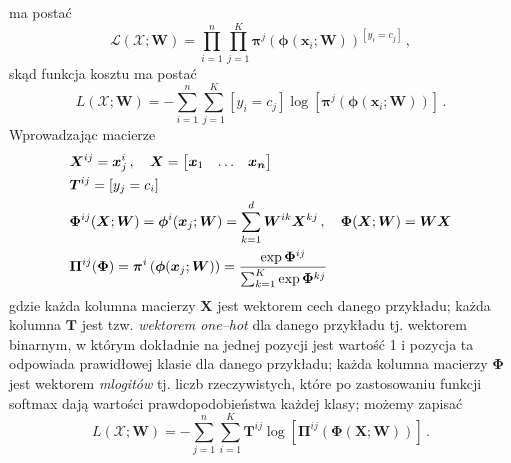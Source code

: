 \documentclass{myclass}
\numberwithin{equation}{subsection}
\begin{document}
ma postać
\begin{equation}
    \mathcal{L}(\mathcal{X}; \bm{W}) = \prod_{i=1}^n \prod_{j=1}^K \bm{\pi}^j\left(\bm{\phi}(\bm{x}_i; \bm{W})\right)^{[y_i = c_j]}\,,
\end{equation}
skąd funkcja kosztu ma postać
\begin{equation}
    L(\mathcal{X}; \bm{W}) = - \sum_{i=1}^n \sum_{j=1}^K [y_i = c_j] \log \left[ \bm{\pi}^j\left(\bm{\phi}(\bm{x}_i; \bm{W})\right)\right]\,.
\end{equation}
Wprowadzając macierze 
\begin{equation*}
    \begin{split}
        &\bm{X}^{ij} = \bm{x}_j^i\,,\quad \bm{X} = \mqty[\bm{x}_1 & \ldots & \bm{x_n}]\\
        &\bm{T}^{ij} = [y_j = c_i]\\
        &\bm{\Phi}^{ij}(\bm{X}; \bm{W}) = \bm{\phi}^i(\bm{x}_j;\bm{W}) = \sum_{k=1}^d \bm{W}^{ik}\bm{X}^{kj}\,,\quad \bm{\Phi}(\bm{X};\bm{W}) = \bm{W}\bm{X}\\
        &\bm{\Pi}^{ij}(\bm{\Phi}) = \bm{\pi}^i\left(\bm{\phi}(\bm{x}_j;\bm{W})\right) = \frac{\exp\bm{\Phi}^{ij}}{\sum_{k=1}^K \exp \bm{\Phi}^{kj}}
    \end{split}
\end{equation*}
gdzie każda kolumna macierzy \(\bm{X}\) jest wektorem cech danego przykładu; każda kolumna
\(\bm{T}\) jest tzw. \emph{wektorem one--hot} dla danego przykładu tj. wektorem binarnym, w którym
dokładnie na jednej pozycji jest wartość 1 i pozycja ta odpowiada prawidłowej klasie dla danego
przykładu; każda kolumna macierzy \(\bm{\Phi}\) jest wektorem \emph{mlogitów} tj. liczb
rzeczywistych, które po zastosowaniu funkcji softmax dają wartości prawdopodobieństwa każdej klasy;
możemy zapisać
\begin{equation}\boxed{
    L(\mathcal{X}; \bm{W}) = -\sum_{j=1}^n\sum_{i=1}^K \bm{T}^{ij} \log \left[ \bm{\Pi}^{ij}(\bm{\Phi}(\bm{X}; \bm{W})) \right]\,.
}\end{equation}
\end{document}
